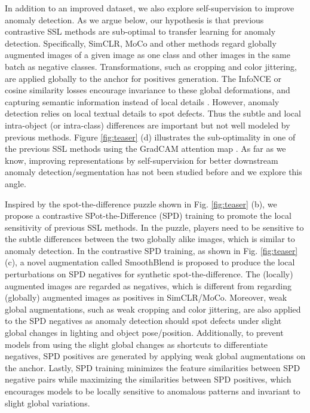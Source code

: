 \documentclass[runningheads]{llncs}
\begin{document}
In addition to an improved dataset, we also explore self-supervision to improve anomaly detection. As we argue below, our hypothesis is that previous contrastive SSL methods \cite{chen2020simple,chen2021exploring,he2020momentum} are sub-optimal to transfer learning for anomaly detection. Specifically, SimCLR, MoCo and other methods regard globally augmented images of a given image as one class and other images in the same batch as negative classes. Transformations, such as cropping and color jittering, are applied globally to the anchor for positives generation. The InfoNCE or cosine similarity losses \cite{chen2020simple,chen2021exploring,he2020momentum} encourage invariance to these global deformations, and capturing semantic information instead of local details \cite{geirhos2020on}. However, anomaly detection relies on local textual details to spot defects. Thus the subtle and local intra-object (or intra-class) differences are important but not well modeled by previous methods. Figure \ref{fig:teaser} (d) illustrates the sub-optimality in one of the previous SSL methods using the GradCAM attention map \cite{selvaraju2017grad}. As far as we know, improving representations by self-supervision for better downstream anomaly detection/segmentation has not been studied before and we explore this angle. 

Inspired by the spot-the-difference puzzle shown in Fig. \ref{fig:teaser} (b), we propose a contrastive SPot-the-Difference (SPD) training to promote the local sensitivity of previous SSL methods. In the puzzle, players need to be sensitive to the subtle differences between the two globally alike images, which is similar to anomaly detection. In the contrastive SPD training, as shown in Fig. \ref{fig:teaser} (c), a novel augmentation called SmoothBlend is proposed to produce the local perturbations on SPD negatives for synthetic spot-the-difference. The (locally) augmented images are regarded as negatives, which is different from regarding (globally) augmented images as positives in SimCLR/MoCo. Moreover, weak global augmentations, such as weak cropping and color jittering, are also applied to the SPD negatives as anomaly detection should spot defects under slight global changes in lighting and object pose/position. Additionally, to prevent models from using the slight global changes as shortcuts to differentiate negatives, SPD positives are generated by applying weak global augmentations on the anchor. Lastly, SPD training minimizes the feature similarities between SPD negative pairs while maximizing the similarities between SPD positives, which encourages models to be locally sensitive to anomalous patterns and invariant to slight global variations.
\end{document}
